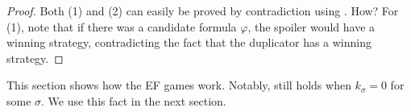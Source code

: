 \documentclass[a4paper,UKenglish,cleveref, autoref, thm-restate, numberwithinsect]{lipics-v2021}
\begin{document}
\begin{proof}
    Both (1) and (2) can easily be proved by contradiction using . How? For (1), note that if there was a candidate formula $\varphi$, the spoiler would have a winning strategy, contradicting the fact that the duplicator has a winning strategy. %
\end{proof}
This section shows how the EF games work. Notably,  still holds when $k_\sigma = 0$ for some $\sigma$. We use this fact in the next section.

%








\end{document}
